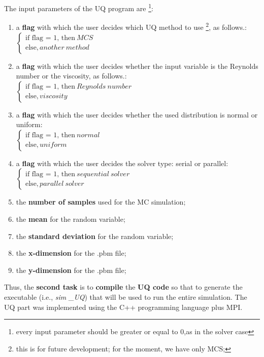 \documentclass[12pt,a4paper]{article}
\begin{document}
The input parameters of the UQ program are \footnote{every input parameter should be greater or equal to 0,as in the solver case}:
\begin{enumerate}
\item {a \textbf{flag} with which the user decides which UQ method to use \footnote{this is for future development; for the moment, we have only MCS;}, as follows.}: \\
$\left\{
  \begin{array}{ccl}
    \text{if flag = 1, then} \ MCS \\
    \text{else}, another \ method 
  \end{array}
\right.$
\item {a \textbf{flag} with which the user decides whether the input variable is the Reynolds number or the viscosity, as follows.}: \\
$\left\{
  \begin{array}{ccl}
    \text{if flag = 1, then} \ Reynolds \ number \\
    \text{else}, viscosity 
  \end{array}
\right.$
\item {a \textbf{flag} with which the user decides whether the used distribution is normal or uniform}: \\
$\left\{
  \begin{array}{ccl}
    \text{if flag = 1, then} \ normal \\
    \text{else}, uniform 
  \end{array}
\right.$
\item {a \textbf{flag} with which the user decides the solver type: serial or parallel}: \\
$\left\{
  \begin{array}{ccl}
    \text{if flag = 1, then} \ sequential\ solver \\
    \text{else}, parallel\ solver
  \end{array}
\right.$
\item {the \textbf{number of samples} used for the MC simulation};
\item {the \textbf{mean} for the random variable};
\item {the \textbf{standard deviation} for the random variable};
\item {the \textbf{x-dimension} for the .pbm file};
\item {the \textbf{y-dimension} for the .pbm file};
\end{enumerate}
Thus, the \textbf{second task} is to \textbf{compile} the \textbf{UQ code} so that to generate the executable (i.e., \emph{sim \_UQ})  that will be used to run the entire simulation.
The UQ part was implemented using the C++ programming language plus MPI. \\
\end{document}
